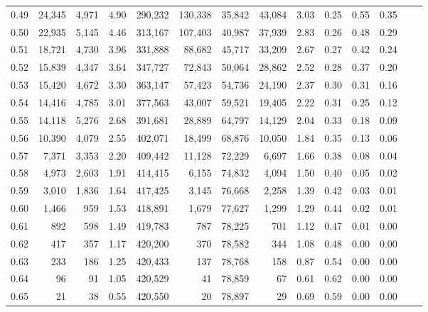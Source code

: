 \begin{tabular}{rrrrrrrrrrrrrr}
0.49 &  24,345 &  4,971 &    4.90 &  290,232 &  130,338 &  35,842 &  43,084 &  3.03 &  0.25 &  0.55 &      0.35 \\
0.50 &  22,935 &  5,145 &    4.46 &  313,167 &  107,403 &  40,987 &  37,939 &  2.83 &  0.26 &  0.48 &      0.29 \\
0.51 &  18,721 &  4,730 &    3.96 &  331,888 &   88,682 &  45,717 &  33,209 &  2.67 &  0.27 &  0.42 &      0.24 \\
0.52 &  15,839 &  4,347 &    3.64 &  347,727 &   72,843 &  50,064 &  28,862 &  2.52 &  0.28 &  0.37 &      0.20 \\
0.53 &  15,420 &  4,672 &    3.30 &  363,147 &   57,423 &  54,736 &  24,190 &  2.37 &  0.30 &  0.31 &      0.16 \\
0.54 &  14,416 &  4,785 &    3.01 &  377,563 &   43,007 &  59,521 &  19,405 &  2.22 &  0.31 &  0.25 &      0.12 \\
0.55 &  14,118 &  5,276 &    2.68 &  391,681 &   28,889 &  64,797 &  14,129 &  2.04 &  0.33 &  0.18 &      0.09 \\
0.56 &  10,390 &  4,079 &    2.55 &  402,071 &   18,499 &  68,876 &  10,050 &  1.84 &  0.35 &  0.13 &      0.06 \\
0.57 &   7,371 &  3,353 &    2.20 &  409,442 &   11,128 &  72,229 &   6,697 &  1.66 &  0.38 &  0.08 &      0.04 \\
0.58 &   4,973 &  2,603 &    1.91 &  414,415 &    6,155 &  74,832 &   4,094 &  1.50 &  0.40 &  0.05 &      0.02 \\
0.59 &   3,010 &  1,836 &    1.64 &  417,425 &    3,145 &  76,668 &   2,258 &  1.39 &  0.42 &  0.03 &      0.01 \\
0.60 &   1,466 &    959 &    1.53 &  418,891 &    1,679 &  77,627 &   1,299 &  1.29 &  0.44 &  0.02 &      0.01 \\
0.61 &     892 &    598 &    1.49 &  419,783 &      787 &  78,225 &     701 &  1.12 &  0.47 &  0.01 &      0.00 \\
0.62 &     417 &    357 &    1.17 &  420,200 &      370 &  78,582 &     344 &  1.08 &  0.48 &  0.00 &      0.00 \\
0.63 &     233 &    186 &    1.25 &  420,433 &      137 &  78,768 &     158 &  0.87 &  0.54 &  0.00 &      0.00 \\
0.64 &      96 &     91 &    1.05 &  420,529 &       41 &  78,859 &      67 &  0.61 &  0.62 &  0.00 &      0.00 \\
0.65 &      21 &     38 &    0.55 &  420,550 &       20 &  78,897 &      29 &  0.69 &  0.59 &  0.00 &      0.00 \\

\end{tabular}
